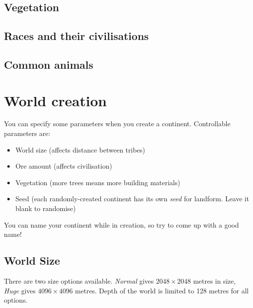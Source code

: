 \documentclass[stock,9pt,nohan]{oblivoir}
\begin{document}
	\subsection{Vegetation}
	
	
	\subsection{Races and their civilisations}
	
	
	\subsection{Common animals}
	
	
\section{World creation}
	You can specify some parameters when you create a continent. Controllable parameters are:
	\begin{itemize}
	\item World size (affects distance between tribes)
	\item Ore amount (affects civilisation)
	\item Vegetation (more trees means more building materials)
	\item Seed (each randomly-created continent has its own \emph{seed} for landform. Leave it blank to randomise)
	\end{itemize}
	
	You can name your continent while in creation, so try to come up with a good name!
	
	\subsection{World Size}
	There are two size options available. \emph{Normal} gives $2048\times2048$ metres in size, \emph{Huge} gives $4096\times4096$ metres. Depth of the world is limited to 128 metres for all options.
	
\end{document}
